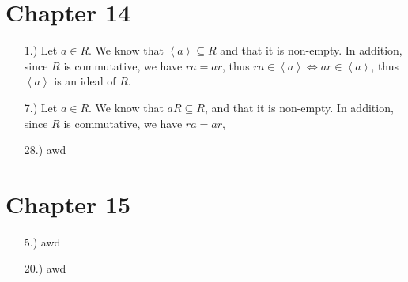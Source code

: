 \documentclass[11pt]{article}
\newcommand{\angleb}[1]{\left\langle#1\right\rangle} %
\begin{document}
\pagestyle{fancy}
\fancyhead{}

\normalsize

\section*{Chapter 14}

\begin{itemize}
    \item [1.)] Let $a \in R$. We know that $\angleb{a} \subseteq R$ and that
    it is non-empty.
    In addition, since $R$ is commutative, we have $ra = ar$, thus
    $ra \in \angleb{a} \iff ar \in \angleb{a}$, thus $\angleb{a}$ is an ideal
    of $R$.

    \item [7.)] Let $a \in R$. We know that $aR \subseteq R$, and that it is
    non-empty.
    In addition, since $R$ is commutative, we have $ra=ar$,

    \item [28.)] awd
\end{itemize}

\section*{Chapter 15}

\begin{itemize}
    \item [5.)] awd
    \item [20.)] awd
\end{itemize}
\end{document}
